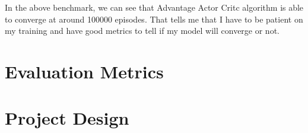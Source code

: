 \documentclass{article}
\begin{document}
  In the above benchmark, we can see that Advantage Actor Critc algorithm is
  able to converge at around 100000 episodes. That tells me that I have to be
  patient on my training and have good metrics to tell if my model will converge
  or not.
  
	\section{Evaluation Metrics}
	
	\section{Project Design}

  \clearpage
  
  
  
  \printglossary
\end{document}
